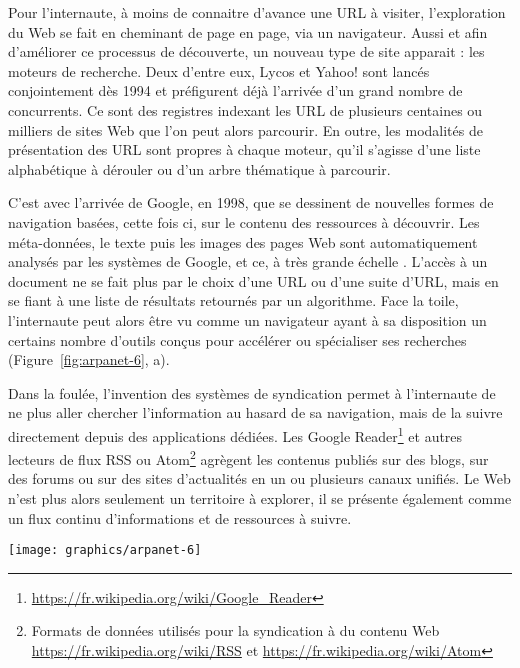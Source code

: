 \documentclass[symmetric,justified,marginals=raggedouter]{tufte-book}
\begin{document}
Pour l'internaute, à moins de connaitre d'avance une URL à visiter, l'exploration du Web se fait en cheminant de page en page, via un navigateur. Aussi et afin d'améliorer ce processus de découverte, un nouveau type de site apparait : les moteurs de recherche. Deux d'entre eux, Lycos et Yahoo! sont lancés conjointement dès 1994 et préfigurent déjà l'arrivée d'un grand nombre de concurrents. Ce sont des registres indexant les URL de plusieurs centaines ou milliers de sites Web  que l'on peut alors parcourir. En outre, les modalités de présentation des URL sont propres à chaque moteur, qu'il s'agisse d'une liste alphabétique à dérouler ou d'un arbre thématique à parcourir.

C'est avec l'arrivée de Google, en 1998, que se dessinent de nouvelles formes de navigation basées, cette fois ci, sur le contenu des ressources à découvrir. Les méta-données, le texte puis les images des pages Web sont automatiquement analysés par les systèmes de Google, et ce, à très grande échelle \citep{brin_anatomy_1998}. L'accès à un document ne se fait plus par le choix d'une URL ou d'une suite d'URL, mais en se fiant à une liste de résultats retournés par un algorithme. Face la toile, l'internaute peut alors être vu comme un navigateur ayant à sa disposition un certains nombre d'outils conçus pour accélérer ou spécialiser ses recherches (Figure~\ref{fig:arpanet-6}, a).   

Dans la foulée, l'invention des systèmes de syndication permet à l'internaute de ne plus aller chercher l'information au hasard de sa navigation, mais de la suivre directement depuis des applications dédiées. Les Google Reader\footnote{\RaggedOuter \url{https://fr.wikipedia.org/wiki/Google\_Reader}} et autres lecteurs de flux RSS ou Atom\footnote{\RaggedOuter Formats de données utilisés pour la syndication à du contenu Web \url{https://fr.wikipedia.org/wiki/RSS} et \url{https://fr.wikipedia.org/wiki/Atom}} agrègent les contenus publiés sur des blogs, sur des forums ou sur des sites d'actualités en un ou plusieurs canaux unifiés. Le Web n'est plus alors seulement un territoire à explorer, il se présente également comme un flux continu d'informations et de ressources à suivre. 

\begin{figure*}
  \texttt{[image: graphics/arpanet-6]}
  \caption{Différents modes de consultation d'une information dans un réseau hypertexte (type Web)}
  \label{fig:arpanet-6}
\end{figure*} 
\end{document}
